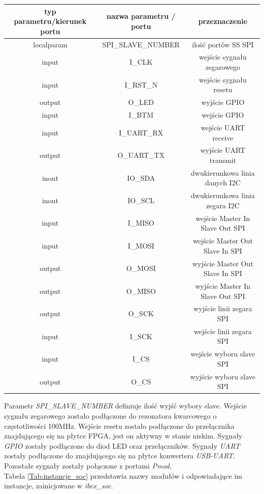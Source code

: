 \documentclass[11pt,a4paper]{article}
\begin{document}
			\begin{center}
			\small
				\begin{tabular}{|c|c|c|}
					\hline
					typ parametru/kierunek portu & nazwa parametru / portu & przeznaczenie \\
					\hline
					localparam & SPI\_SLAVE\_NUMBER & ilość portów SS SPI \\
					\hline
					input & I\_CLK & wejście sygnału zegarowego  \\
					\hline
					input & I\_RST\_N & wejście sygnału resetu \\
					\hline
					output & O\_LED & wyjście GPIO \\
					\hline
					input & I\_BTM & wejście GPIO \\
					\hline
					input & I\_UART\_RX & wejście UART receive \\
					\hline
					output & O\_UART\_TX & wyjście UART transmit \\
					\hline
					inout & IO\_SDA & dwukierunkowa linia danych I2C \\
					\hline		
					inout & IO\_SCL & dwukierunkowa linia zegara I2C \\
					\hline	
					input & I\_MISO & wejście Master In Slave Out SPI \\
					\hline		
					input & I\_MOSI & wejście Master Out Slave In SPI \\
					\hline	
					output & O\_MOSI & wyjście Master Out Slave In SPI \\
					\hline		
					output & O\_MISO & wyjście Master In Slave Out SPI \\
					\hline																			output & O\_SCK & wyjście linii zegara SPI \\
					\hline	
					input & I\_SCK & wejście linii zegara SPI \\
					\hline		
					input & I\_CS & wejście wyboru slave SPI \\
					\hline		
					output & O\_CS & wyjście wyboru slave SPI \\
					\hline				
				\end{tabular}
		\end{center}
Parametr \textit{SPI\_SLAVE\_NUMBER} definiuje ilość wyjść wybory slave. Wejście sygnału zegarowego zostało podłączone do rezonatora kwarcowego o częstotliwości 100MHz. Wejście resetu zostało podłączone do przełącznika znajdującego się na płytce FPGA, jest on aktywny w stanie niskim. Sygnały \textit{GPIO} zostały podłączone do diod LED oraz przełączników. Sygnały \textit{UART} zostały podłączone do znajdującego się na płytce konwertera \textit{USB-UART}. Pozostałe sygnały zostały połączone z portami \textit{Pmod}.
\\
Tabela \ref{Tab:instancje_soc} przedstawia nazwy modułów i odpowiadające im instancje, zainicjowane w \textit{ibex\_soc}.
\end{document}
